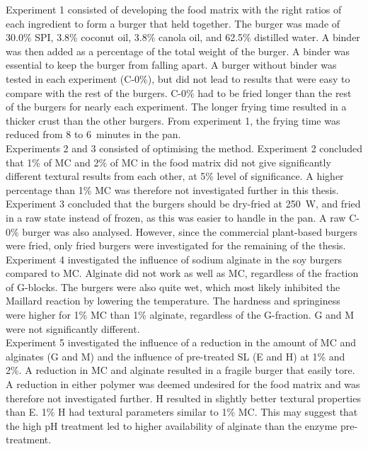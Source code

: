 Experiment 1 consisted of developing the food matrix with the right ratios of each ingredient to form a burger that held together. The burger was made of 30.0\% SPI, 3.8\% coconut oil, 3.8\% canola oil, and 62.5\% distilled water. A binder was then added as a percentage of the total weight of the burger. A binder was essential to keep the burger from falling apart. A burger without binder was tested in each experiment (C-0\%), but did not lead to results that were easy to compare with the rest of the burgers. 
C-0\% had to be fried longer than the rest of the burgers for nearly each experiment. The longer frying time resulted in a thicker crust than the other burgers. From experiment 1, the frying time was reduced from 8 to 6~minutes in the pan. \\

Experiments 2 and 3 consisted of optimising the method. Experiment 2 concluded that 1\% of MC and 2\% of MC in the food matrix did not give significantly different textural results from each other, at 5\% level of significance. A higher percentage than 1\% MC was therefore not investigated further in this thesis. Experiment 3 concluded that the burgers should be dry-fried at 250~W, and fried in a raw state instead of frozen, as this was easier to handle in the pan. A raw C-0\% burger was also analysed. However, since the commercial plant-based burgers were fried, only fried burgers were investigated for the remaining of the thesis.\\

Experiment 4 investigated the influence of sodium alginate in the soy burgers compared to MC. Alginate did not work as well as MC, regardless of the fraction of G-blocks. The burgers were also quite wet, which most likely inhibited the Maillard reaction by lowering the temperature. The hardness and springiness were higher for 1\% MC than 1\% alginate, regardless of the G-fraction. G and M were not significantly different. \\

Experiment 5 investigated the influence of a reduction in the amount of MC and alginates (G and M) and the influence of pre-treated SL (E and H) at 1\% and 2\%. A reduction in MC and alginate resulted in a fragile burger that easily tore. A reduction in either polymer was deemed undesired for the food matrix and was therefore not investigated further. H resulted in slightly better textural properties than E. 1\% H had textural parameters similar to 1\% MC. This may suggest that the high pH treatment led to higher availability of alginate than the enzyme pre-treatment. \\

